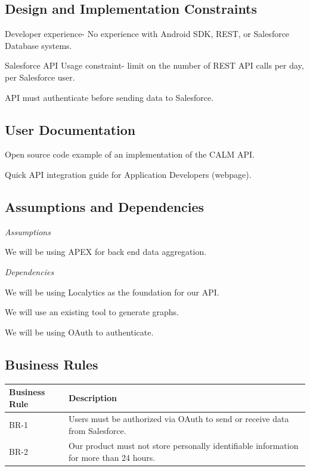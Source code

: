 \documentclass[12pt,oneside,letterpaper]{article}
\newenvironment{packed_enumerate}{ %
\vspace{-7mm}
\begin{enumerate}
  \setlength{\itemsep}{0pt}
  \setlength{\parskip}{0pt}
  \setlength{\parsep}{0pt}
}{\end{enumerate}
\vspace{-8mm}}
\begin{document}
\subsection{Design and Implementation Constraints}
\vspace{0.25in}
\begin{packed_enumerate}
\item Developer experience- No experience with Android SDK, REST, or 
Salesforce Database systems.
\item Salesforce API Usage constraint- limit on the number of REST API 
calls per day, per Salesforce user.
\item API must authenticate before sending data to Salesforce.
\end{packed_enumerate}

\subsection{User Documentation}
\vspace{0.25in}
\begin{packed_enumerate}
\item Open source code example of an implementation of the CALM API.
\item Quick API integration guide for Application Developers 
(webpage).
\end{packed_enumerate}

\subsection{Assumptions and Dependencies}
\textit{Assumptions}\\
\begin{packed_enumerate}
\item We will be using APEX for back end data aggregation.\\
\end{packed_enumerate}
\textit{Dependencies}\\
\begin{packed_enumerate}
\item We will be using Localytics as the foundation for our API.
\item We will use an existing tool to generate graphs.
\item We will be using OAuth to authenticate.
\end{packed_enumerate}

\subsection{Business Rules}
\begin{longtable}{|l|p{3.8in}|}
\hline
\textbf{Business Rule}&\textbf{Description}\\
\hline
BR-1 & Users must be authorized via OAuth to send or receive data from 
Salesforce.\\
\hline
BR-2 & Our product must not store personally identifiable information 
for more than 24 hours.\\
\hline
\end{longtable}
\end{document}
